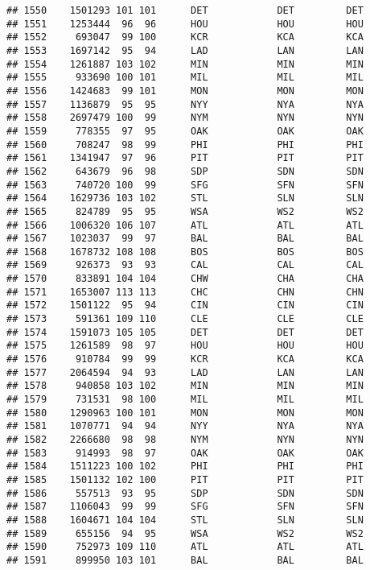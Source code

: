 \documentclass[]{article}
\begin{document}
\begin{verbatim}
## 1550    1501293 101 101      DET            DET         DET
## 1551    1253444  96  96      HOU            HOU         HOU
## 1552     693047  99 100      KCR            KCA         KCA
## 1553    1697142  95  94      LAD            LAN         LAN
## 1554    1261887 103 102      MIN            MIN         MIN
## 1555     933690 100 101      MIL            MIL         MIL
## 1556    1424683  99 101      MON            MON         MON
## 1557    1136879  95  95      NYY            NYA         NYA
## 1558    2697479 100  99      NYM            NYN         NYN
## 1559     778355  97  95      OAK            OAK         OAK
## 1560     708247  98  99      PHI            PHI         PHI
## 1561    1341947  97  96      PIT            PIT         PIT
## 1562     643679  96  98      SDP            SDN         SDN
## 1563     740720 100  99      SFG            SFN         SFN
## 1564    1629736 103 102      STL            SLN         SLN
## 1565     824789  95  95      WSA            WS2         WS2
## 1566    1006320 106 107      ATL            ATL         ATL
## 1567    1023037  99  97      BAL            BAL         BAL
## 1568    1678732 108 108      BOS            BOS         BOS
## 1569     926373  93  93      CAL            CAL         CAL
## 1570     833891 104 104      CHW            CHA         CHA
## 1571    1653007 113 113      CHC            CHN         CHN
## 1572    1501122  95  94      CIN            CIN         CIN
## 1573     591361 109 110      CLE            CLE         CLE
## 1574    1591073 105 105      DET            DET         DET
## 1575    1261589  98  97      HOU            HOU         HOU
## 1576     910784  99  99      KCR            KCA         KCA
## 1577    2064594  94  93      LAD            LAN         LAN
## 1578     940858 103 102      MIN            MIN         MIN
## 1579     731531  98 100      MIL            MIL         MIL
## 1580    1290963 100 101      MON            MON         MON
## 1581    1070771  94  94      NYY            NYA         NYA
## 1582    2266680  98  98      NYM            NYN         NYN
## 1583     914993  98  97      OAK            OAK         OAK
## 1584    1511223 100 102      PHI            PHI         PHI
## 1585    1501132 102 100      PIT            PIT         PIT
## 1586     557513  93  95      SDP            SDN         SDN
## 1587    1106043  99  99      SFG            SFN         SFN
## 1588    1604671 104 104      STL            SLN         SLN
## 1589     655156  94  95      WSA            WS2         WS2
## 1590     752973 109 110      ATL            ATL         ATL
## 1591     899950 103 101      BAL            BAL         BAL

\end{verbatim}
\end{document}
